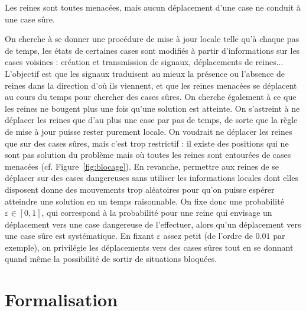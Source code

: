 \begin{floatingfigure}[r]{.5\textwidth}
\centering
\newgame
{}
\notationoff
\showboard
\caption{Les reines sont toutes menacées, mais aucun déplacement d'une case ne conduit à une case sûre.}
\label{fig:blocage}
\end{floatingfigure}
On cherche à se donner une procédure de mise à jour locale telle qu'à chaque pas
de temps, les états de certaines cases sont modifiés à partir d'informations sur
les  cases voisines  :  création  et transmission  de  signaux, déplace\-ments  de
reines...  L'objectif est que  les signaux  traduisent au  mieux la  présence ou
l'absence  de reines  dans la  direction d'où  ils vien\-nent,  et que  les reines
menacées  se déplacent  au cours  du  temps pour  chercher des  cases sûres.  On
cherche également à  ce que les reines ne bougent plus  une fois qu'une solution
est atteinte. On s'astreint à ne déplacer les reines  que d'au plus une case par pas de temps,
de sorte que la règle de mise  à jour puisse rester purement locale. On voudrait
ne déplacer les reines que sur des  cases sûres, mais c'est trop restrictif : il
existe des  positions qui ne  sont pas solution  du problème mais où  toutes les
reines  sont  entourées de  cases  menacées  (cf. Figure~\ref{fig:blocage}).  En
revanche, permettre  aux reines  de se déplacer  sur des cases  dangereuses sans
utiliser les informations locales dont elles disposent donne des mouvements trop
aléatoires  pour  qu'on  puisse  espérer  atteindre une  solution  en  un  temps
raisonnable.  On  fixe  donc   une  probabilité  $\varepsilon  \in  [0,1]$,  qui
correspond à la probabilité pour une  reine qui envisage un déplacement vers une
case dangereuse de  l'effectuer, alors qu'un déplacement vers  une case sûre est
systématique.  En fixant  $\varepsilon$ assez  petit (de  l'ordre de  $0.01$ par
exemple), on privilégie les déplacements vers des cases sûres tout en se donnant
quand même la possibilité de sortir de situations bloquées.


\section{Formalisation}

